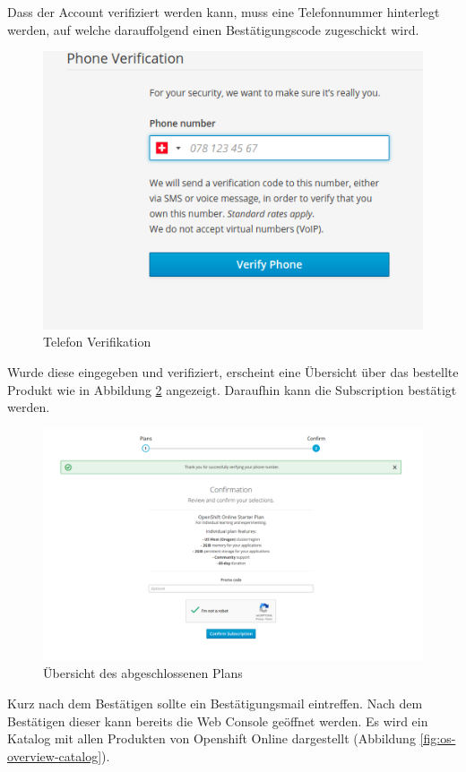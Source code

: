 \documentclass[12pt,a4paper]{article}
\begin{document}
Dass der Account verifiziert werden kann, muss eine Telefonnummer hinterlegt werden, auf welche darauffolgend einen Bestätigungscode zugeschickt wird. 
\begin{figure}[h]
	\centering
	\includegraphics[width=0.7\linewidth]{img/os-phone-validation}
	\caption{Telefon Verifikation}
	\label{fig:os-phone-validation}
\end{figure}
Wurde diese eingegeben und verifiziert, erscheint eine Übersicht über das bestellte Produkt wie in Abbildung \ref{fig:os-overview} angezeigt. Daraufhin kann die Subscription bestätigt werden.
\begin{figure}[h]
	\centering
	\includegraphics[width=0.9\linewidth]{img/os-overview}
	\caption{Übersicht des abgeschlossenen Plans}
	\label{fig:os-overview}
\end{figure}
Kurz nach dem Bestätigen sollte ein Bestätigungsmail eintreffen. Nach dem Bestätigen dieser kann bereits die Web Console geöffnet werden. Es wird ein Katalog mit allen Produkten von Openshift Online dargestellt (Abbildung \ref{fig:os-overview-catalog}).
\end{document}
